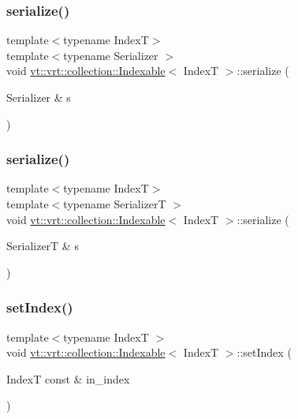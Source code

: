 \subsubsection{\texorpdfstring{serialize()}{serialize()}\hspace{0.1cm}{\footnotesize\ttfamily [1/2]}}
{\footnotesize\ttfamily template$<$typename IndexT$>$ \\
template$<$typename Serializer $>$ \\
void \hyperlink{structvt_1_1vrt_1_1collection_1_1_indexable}{vt\+::vrt\+::collection\+::\+Indexable}$<$ IndexT $>$\+::serialize (\begin{DoxyParamCaption}\item[{Serializer \&}]{s }\end{DoxyParamCaption})\hspace{0.3cm}{\ttfamily [protected]}}

\mbox{\label{structvt_1_1vrt_1_1collection_1_1_indexable_adadd30272517d10e6124a65edc48fb65}} 
\subsubsection{\texorpdfstring{serialize()}{serialize()}\hspace{0.1cm}{\footnotesize\ttfamily [2/2]}}
{\footnotesize\ttfamily template$<$typename IndexT$>$ \\
template$<$typename SerializerT $>$ \\
void \hyperlink{structvt_1_1vrt_1_1collection_1_1_indexable}{vt\+::vrt\+::collection\+::\+Indexable}$<$ IndexT $>$\+::serialize (\begin{DoxyParamCaption}\item[{SerializerT \&}]{s }\end{DoxyParamCaption})}

\mbox{\label{structvt_1_1vrt_1_1collection_1_1_indexable_ac874c5ebba6b238f8f57018c01a3c67c}} 
\subsubsection{\texorpdfstring{set\+Index()}{setIndex()}}
{\footnotesize\ttfamily template$<$typename IndexT $>$ \\
void \hyperlink{structvt_1_1vrt_1_1collection_1_1_indexable}{vt\+::vrt\+::collection\+::\+Indexable}$<$ IndexT $>$\+::set\+Index (\begin{DoxyParamCaption}\item[{IndexT const \&}]{in\+\_\+index }\end{DoxyParamCaption})\hspace{0.3cm}{\ttfamily [private]}}

